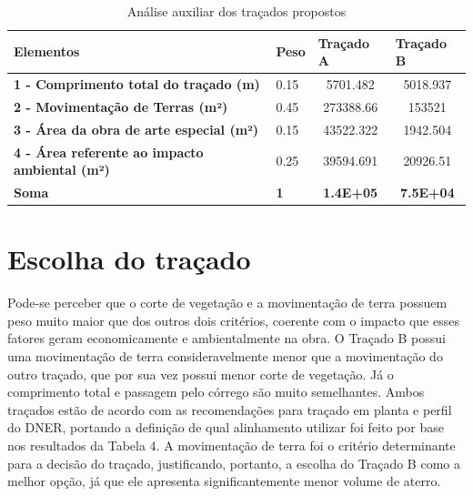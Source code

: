 \begin{table}[h]
	
	\caption{Análise auxiliar dos traçados propostos}\label{tab:tab_2}
	\begin{tabular}{|ll|l|c|c|}
		\hline
		\multicolumn{2}{|l|}{Elementos}                                               & \textbf{Peso} & \multicolumn{1}{l|}{\textbf{Traçado A}} & \multicolumn{1}{l|}{\textbf{Traçado B}} \\ \hline
		\multicolumn{2}{|l|}{\textbf{1 -   Comprimento total do traçado (m)}}         & 0.15          & 5701.482                                & 5018.937                                \\ \hline
		\multicolumn{2}{|l|}{\textbf{2 -   Movimentação de Terras (m²)}}              & 0.45          & 273388.66                               & 153521                                  \\ \hline
		\multicolumn{2}{|l|}{\textbf{3 - Área da   obra de arte especial (m²)}}       & 0.15          & 43522.322                               & 1942.504                                \\ \hline
		\multicolumn{2}{|l|}{\textbf{4 - Área   referente ao impacto ambiental (m²)}} & 0.25          & 39594.691                               & 20926.51                                \\ \hline
		\multicolumn{2}{|l|}{\textbf{Soma}}                                           & \textbf{1}    & \textbf{1.4E+05}                        & \textbf{7.5E+04}                        \\ \hline
	\end{tabular}
\end{table}


\section{Escolha do traçado }


Pode-se perceber que o corte de vegetação e a movimentação de terra 
possuem peso muito maior que dos outros dois critérios, coerente com o impacto 
que esses fatores geram economicamente e ambientalmente na obra. O Traçado 
B possui uma movimentação de terra consideravelmente menor que a 
movimentação do outro traçado, que por sua vez possui menor corte de vegetação. 
Já o comprimento total e passagem pelo córrego são muito semelhantes.  
Ambos traçados estão de acordo com as recomendações para traçado em 
planta e perfil do DNER, portando a definição de qual alinhamento utilizar foi feito 
por base nos resultados da Tabela 4. A movimentação de terra foi o critério 
determinante para a decisão do traçado, justificando, portanto, a escolha do 
Traçado B como a melhor opção, já que ele apresenta significantemente 
menor volume de aterro. 





